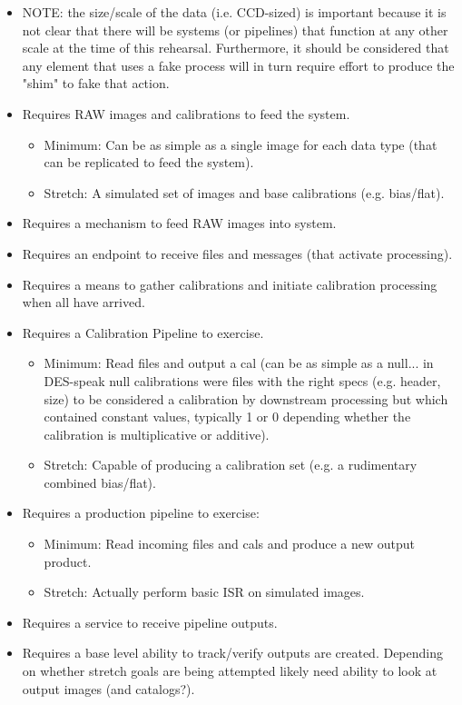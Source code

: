 \begin{itemize}
\item NOTE: the size/scale of the data (i.e. CCD-sized) is important because 
it is not clear that there will be systems (or pipelines) that function at 
any other scale at the time of this rehearsal.  Furthermore, it should be 
considered that any element that uses a fake process will in turn require 
effort to produce the "shim" to fake that action.
\item Requires RAW images and calibrations to feed the system.
    \begin{itemize}
    \item Minimum: Can be as simple as a single image for each data type  (that can be replicated to feed the system).
    \item Stretch: A simulated set of images and base calibrations (e.g. bias/flat).
    \end{itemize}
\item Requires a mechanism to feed RAW images into system.
\item Requires an endpoint to receive files and messages (that activate processing).
\item Requires a means to gather calibrations and initiate calibration processing when all have arrived.
\item Requires a Calibration Pipeline to exercise.
    \begin{itemize}
    \item Minimum: Read files and output a cal (can be as simple as a null... in DES-speak null calibrations were files with the right specs (e.g. header, size) to be considered a calibration by downstream processing but which contained constant values, typically 1 or 0 depending whether the calibration is multiplicative or additive).
    \item Stretch: Capable of producing a calibration set (e.g. a rudimentary combined bias/flat).
    \end{itemize}
\item Requires a production pipeline to exercise:
    \begin{itemize}
    \item Minimum: Read incoming files and cals and produce a new output product.
    \item Stretch: Actually perform basic ISR on simulated images.
    \end{itemize}
\item Requires a service to receive pipeline outputs.
\item Requires a base level ability to track/verify outputs are created.  Depending on whether stretch goals are being attempted likely need ability to look at output images (and catalogs?).
\end{itemize}




